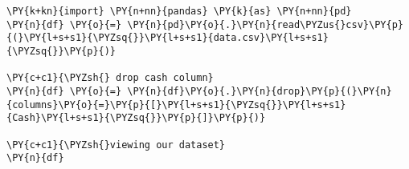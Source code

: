     \begin{tcolorbox}[breakable, size=fbox, boxrule=1pt, pad at break*=1mm,colback=cellbackground, colframe=cellborder]
\begin{Verbatim}[commandchars=\\\{\}]
\PY{k+kn}{import} \PY{n+nn}{pandas} \PY{k}{as} \PY{n+nn}{pd}
\PY{n}{df} \PY{o}{=} \PY{n}{pd}\PY{o}{.}\PY{n}{read\PYZus{}csv}\PY{p}{(}\PY{l+s+s1}{\PYZsq{}}\PY{l+s+s1}{data.csv}\PY{l+s+s1}{\PYZsq{}}\PY{p}{)}

\PY{c+c1}{\PYZsh{} drop cash column}
\PY{n}{df} \PY{o}{=} \PY{n}{df}\PY{o}{.}\PY{n}{drop}\PY{p}{(}\PY{n}{columns}\PY{o}{=}\PY{p}{[}\PY{l+s+s1}{\PYZsq{}}\PY{l+s+s1}{Cash}\PY{l+s+s1}{\PYZsq{}}\PY{p}{]}\PY{p}{)}

\PY{c+c1}{\PYZsh{}viewing our dataset}
\PY{n}{df}
\end{Verbatim}
\end{tcolorbox}

